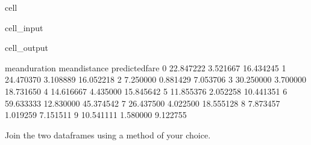 \documentclass[letterpaper,10pt,english]{sphinxmanual}
\begin{document}
\begin{sphinxuseclass}{cell}
\begin{sphinxuseclass}{cell_input}
\begin{sphinxVerbatim}[commandchars=\\\{\}]
\end{sphinxVerbatim}

\end{sphinxuseclass}
\begin{sphinxuseclass}{cell_output}
\begin{sphinxVerbatim}[commandchars=\\\{\}]
   mean\PYGZus{}duration  mean\PYGZus{}distance  predicted\PYGZus{}fare
0      22.847222       3.521667       16.434245
1      24.470370       3.108889       16.052218
2       7.250000       0.881429        7.053706
3      30.250000       3.700000       18.731650
4      14.616667       4.435000       15.845642
5      11.855376       2.052258       10.441351
6      59.633333      12.830000       45.374542
7      26.437500       4.022500       18.555128
8       7.873457       1.019259        7.151511
9      10.541111       1.580000        9.122755
\end{sphinxVerbatim}

\end{sphinxuseclass}
\end{sphinxuseclass}
\sphinxAtStartPar
{}

\sphinxAtStartPar
Join the two dataframes using a method of your choice.
\end{document}
